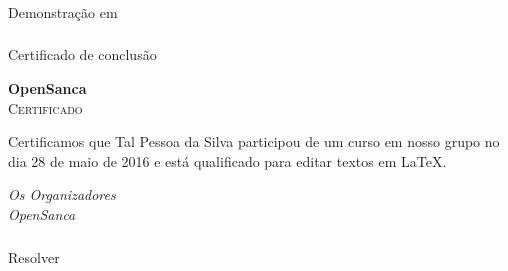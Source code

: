 \begin{frame}
  \frametitle{}
  \huge
  Demonstração em 
\end{frame}

\begin{frame}
  \frametitle{}
  \Huge
  Certificado de conclusão
\end{frame}

\begin{frame}[plain]

  {\huge\textbf{OpenSanca}}\\[2em]
  {\LARGE\textsc{Certificado}}

  \noindent Certificamos que Tal Pessoa da Silva participou de um curso em
  nosso grupo no dia 28 de maio de 2016 e está qualificado para editar textos
  em \LaTeX.

  \vfill
  \emph{Os Organizadores}\\
  \emph{OpenSanca}

\end{frame}

\begin{frame}
  \frametitle{}
  \Huge
  Resolver 
\end{frame}
